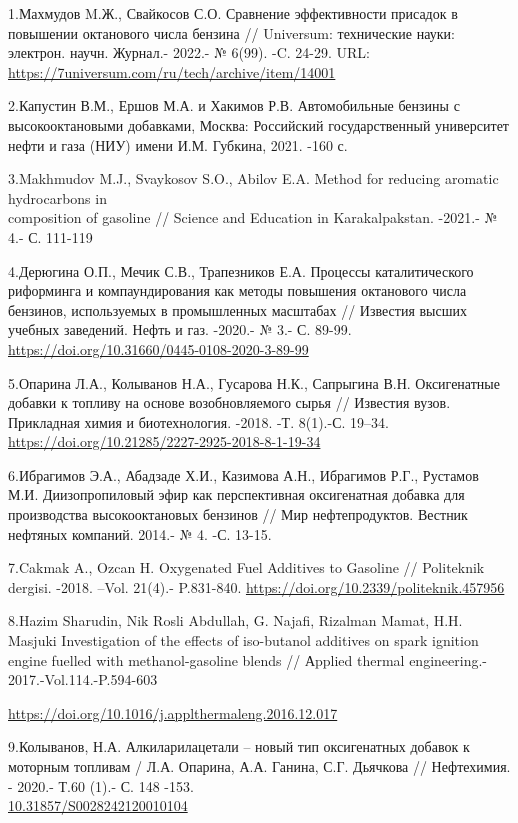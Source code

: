 \begin{references}
1.Махмудов M.Ж., Свайкосов С.О. Сравнение эффективности присадок в
повышении октанового числа бензина // Universum: технические науки:
электрон. научн. Журнал.- 2022.- № 6(99). -C. 24-29. URL:
\url{https://7universum.com/ru/tech/archive/item/14001}

2.Капустин В.М., Ершов М.А. и Хакимов Р.В. Автомобильные бензины с
высокооктановыми добавками, Москва: Российский государственный
университет нефти и газа (НИУ) имени И.М. Губкина, 2021. -160 с.

3.Makhmudov M.J., Svaykosov S.O., Abilov E.A. Method for reducing
aromatic hydrocarbons in \\composition of gasoline // Science and
Education in Karakalpakstan. -2021.- № 4.- С. 111-119

4.Дерюгина О.П., Мечик С.В., Трапезников Е.А. Процессы каталитического
риформинга и компаундирования как методы повышения октанового числа
бензинов, используемых в промышленных масштабах // Известия высших
учебных заведений. Нефть и газ. -2020.- № 3.- С. 89-99.
\url{https://doi.org/10.31660/0445-0108-2020-3-89-99}

5.Опарина Л.А., Колыванов Н.А., Гусарова Н.К., Сапрыгина В.Н.
Оксигенатные добавки к топливу на основе возобновляемого сырья //
Известия вузов. Прикладная химия и биотехнология. -2018. -Т. 8(1).-С.
19--34. \url{https://doi.org/10.21285/2227-2925-2018-8-1-19-34}

6.Ибрагимов Э.А., Абадзаде Х.И., Казимова А.Н., Ибрагимов Р.Г., Рустамов
М.И. Диизопропиловый эфир как перспективная оксигенатная добавка для
производства высокооктановых бензинов // Мир нефтепродуктов. Вестник
нефтяных компаний. 2014.- № 4. -С. 13-15.

7.Cakmak A., Ozcan H. Oxygenated Fuel Additives to Gasoline //
Politeknik dergisi. -2018. --Vol. 21(4).- P.831-840.
\url{https://doi.org/10.2339/politeknik.457956}

8.Hazim Sharudin, Nik Rosli Abdullah, G. Najafi, Rizalman Mamat, H.H.
Masjuki Investigation of the effects of iso-butanol additives on spark
ignition engine fuelled with methanol-gasoline blends // Аpplied thermal
engineering.- 2017.-Vol.114.-P.594-603

\url{https://doi.org/10.1016/j.applthermaleng.2016.12.017}

9.Колыванов, Н.А. Алкиларилацетали -- новый тип оксигенатных добавок к
моторным топливам / Л.А. Опарина, А.А. Ганина, С.Г. Дьячкова //
Нефтехимия. - 2020.- Т.60 (1).- С. 148 -153.
\\\href{https://doi.org/10.31857/S0028242120010104}{10.31857/S0028242120010104}


\end{references}
